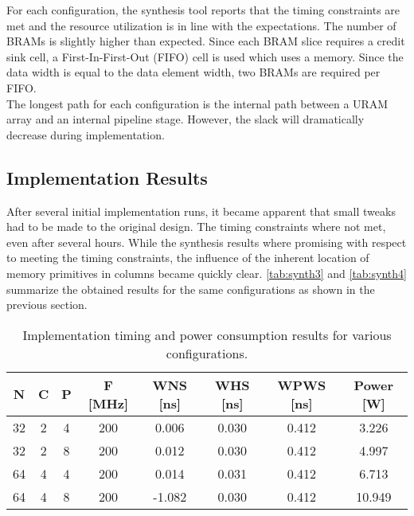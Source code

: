 For each configuration, the synthesis tool reports that the timing constraints are met and the resource utilization is in line with the expectations. The number of BRAMs is slightly higher than expected. Since each BRAM slice requires a credit sink cell, a First-In-First-Out (FIFO) cell is used which uses a memory. Since the data width is equal to the data element width, two BRAMs are required per FIFO.\\
The longest path for each configuration is the internal path between a URAM array and an internal pipeline stage. However, the slack will dramatically decrease during implementation.



\subsection{Implementation Results}
After several initial implementation runs, it became apparent that small tweaks had to be made to the original design. The timing constraints where not met, even after several hours. While the synthesis results where promising with respect to meeting the timing constraints, the influence of the inherent location of memory primitives in columns became quickly clear. \autoref{tab:synth3} and \autoref{tab:synth4} summarize the obtained results for the same configurations as shown in the previous section.

\begin{table}[H]
  \centering
  \caption{Implementation timing and power consumption results for various configurations.}
  \label{tab:synth3}
  \begin{tabular}{ c | c | c || c || c | c | c || c }
    \textbf{N} & \textbf{C} & \textbf{P} & \textbf{F [MHz]} & \textbf{WNS [ns]} & \textbf{WHS [ns]} & \textbf{WPWS [ns]} & \textbf{Power [W]} \\ \hline \hline
    32 & 2 & 4 & 200 & 0.006 & 0.030 & 0.412 & 3.226 \\
    32 & 2 & 8 & 200 & 0.012 & 0.030 & 0.412 & 4.997 \\
    64 & 4 & 4 & 200 & 0.014 & 0.031 & 0.412 & 6.713 \\
    64 & 4 & 8 & 200 & -1.082 & 0.030 & 0.412 & 10.949 \\
  \end{tabular}
\end{table}

